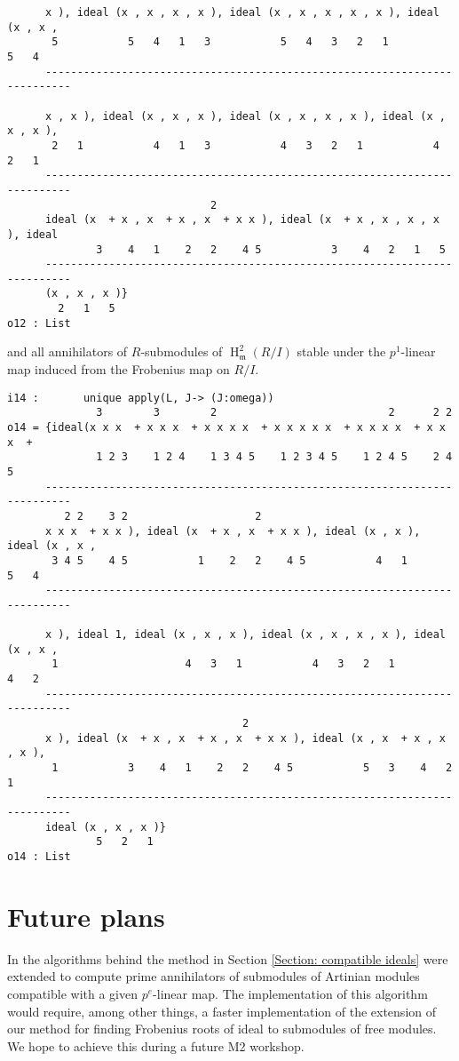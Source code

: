 \documentclass[11pt]{amsart}
\DeclareMathOperator{\HH}{H}
\begin{document}
\begin{example}
\begin{verbatim}
      x ), ideal (x , x , x , x ), ideal (x , x , x , x , x ), ideal (x , x ,
       5           5   4   1   3           5   4   3   2   1           5   4
      --------------------------------------------------------------------------

      x , x ), ideal (x , x , x ), ideal (x , x , x , x ), ideal (x , x , x ),
       2   1           4   1   3           4   3   2   1           4   2   1
      --------------------------------------------------------------------------
                                2
      ideal (x  + x , x  + x , x  + x x ), ideal (x  + x , x , x , x ), ideal
              3    4   1    2   2    4 5           3    4   2   1   5
      --------------------------------------------------------------------------
      (x , x , x )}
        2   1   5
o12 : List
\end{verbatim}
and all annihilators of $R$-submodules of $\HH^2_{\mathfrak{m}} (R/I)$ stable under the $p^1$-linear map induced from the Frobenius map on $R/I$.
\begin{verbatim}
i14 :       unique apply(L, J-> (J:omega))
              3        3        2                           2      2 2
o14 = {ideal(x x x  + x x x  + x x x x  + x x x x x  + x x x x  + x x x  +
              1 2 3    1 2 4    1 3 4 5    1 2 3 4 5    1 2 4 5    2 4 5
      --------------------------------------------------------------------------
         2 2    3 2                    2
      x x x  + x x ), ideal (x  + x , x  + x x ), ideal (x , x ), ideal (x , x ,
       3 4 5    4 5           1    2   2    4 5           4   1           5   4
      --------------------------------------------------------------------------

      x ), ideal 1, ideal (x , x , x ), ideal (x , x , x , x ), ideal (x , x ,
       1                    4   3   1           4   3   2   1           4   2
      --------------------------------------------------------------------------
                                     2
      x ), ideal (x  + x , x  + x , x  + x x ), ideal (x , x  + x , x , x ),
       1           3    4   1    2   2    4 5           5   3    4   2   1
      --------------------------------------------------------------------------
      ideal (x , x , x )}
              5   2   1
o14 : List
\end{verbatim}

\end{example}

\section{Future plans}

In \cite{KatzmanZhangAlgorithm} the algorithms behind the method in Section \ref{Section: compatible ideals} were extended
to compute prime annihilators of submodules of Artinian modules compatible with a given $p^{e}$-linear map. The implementation of this algorithm
would require, among other things, a faster implementation of the extension of our method for finding Frobenius roots of ideal to submodules of free modules.
We hope to achieve this during a future M2 workshop.




\end{document}
